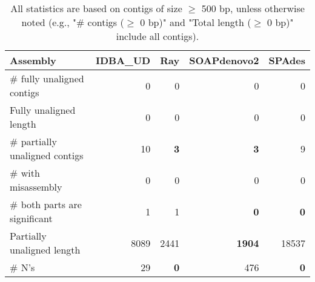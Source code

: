 \documentclass[12pt,a4paper]{article}
\begin{document}
\begin{table}[ht]
\begin{center}
\caption{All statistics are based on contigs of size $\geq$ 500 bp, unless otherwise noted (e.g., "\# contigs ($\geq$ 0 bp)" and "Total length ($\geq$ 0 bp)" include all contigs).}
\begin{tabular}{|l*{4}{|r}|}
\hline
Assembly & IDBA\_UD & Ray & SOAPdenovo2 & SPAdes \\ \hline
\# fully unaligned contigs & 0 & 0 & 0 & 0 \\ \hline
Fully unaligned length & 0 & 0 & 0 & 0 \\ \hline
\# partially unaligned contigs & 10 & {\bf 3} & {\bf 3} & 9 \\ \hline
\hspace{5mm}\# with misassembly & 0 & 0 & 0 & 0 \\ \hline
\hspace{5mm}\# both parts are significant & 1 & 1 & {\bf 0} & {\bf 0} \\ \hline
Partially unaligned length & 8089 & 2441 & {\bf 1904} & 18537 \\ \hline
\# N's & 29 & {\bf 0} & 476 & {\bf 0} \\ \hline
\end{tabular}
\end{center}
\end{table}
\end{document}
